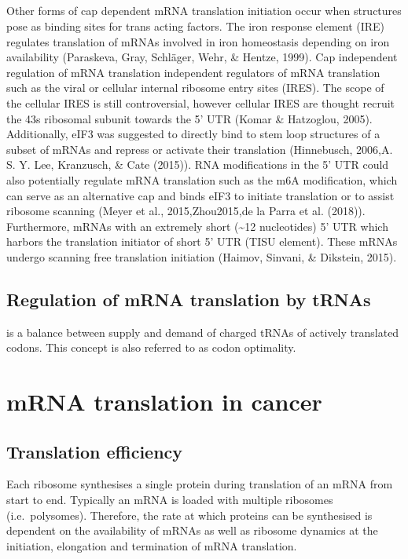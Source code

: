 \documentclass[12pt,openany]{book}
\begin{document}
\subsection{}

Other forms of cap dependent mRNA translation initiation occur when
structures pose as binding sites for trans acting factors. The iron
response element (IRE) regulates translation of mRNAs involved in iron
homeostasis depending on iron availability (Paraskeva, Gray, Schläger,
Wehr, \& Hentze, 1999). Cap independent regulation of mRNA translation
independent regulators of mRNA translation such as the viral or cellular
internal ribosome entry sites (IRES). The scope of the cellular IRES is
still controversial, however cellular IRES are thought recruit the 43s
ribosomal subunit towards the 5' UTR (Komar \& Hatzoglou, 2005).
Additionally, eIF3 was suggested to directly bind to stem loop
structures of a subset of mRNAs and repress or activate their
translation (Hinnebusch, 2006,A. S. Y. Lee, Kranzusch, \& Cate (2015)).
RNA modifications in the 5' UTR could also potentially regulate mRNA
translation such as the m6A modification, which can serve as an
alternative cap and binds eIF3 to initiate translation or to assist
ribosome scanning (Meyer et al., 2015,Zhou2015,de la Parra et al.
(2018)). Furthermore, mRNAs with an extremely short (\textasciitilde{}12
nucleotides) 5' UTR which harbors the translation initiator of short 5'
UTR (TISU element). These mRNAs undergo scanning free translation
initiation (Haimov, Sinvani, \& Dikstein, 2015).

\subsection{Regulation of mRNA translation by tRNAs} \label{tRNA}

is a balance between supply and demand of charged tRNAs of actively
translated codons. This concept is also referred to as codon optimality.

\section{mRNA translation in cancer} \label{translationInCancer}

\subsection{Translation efficiency}

Each ribosome synthesises a single protein during translation of an mRNA
from start to end. Typically an mRNA is loaded with multiple ribosomes
(i.e.~polysomes). Therefore, the rate at which proteins can be
synthesised is dependent on the availability of mRNAs as well as
ribosome dynamics at the initiation, elongation and termination of mRNA
translation.
\end{document}
